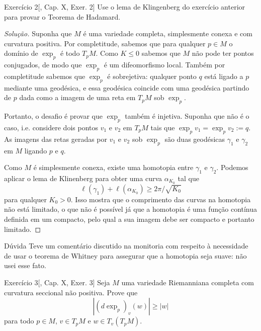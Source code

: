 \begin{thing6}{Exercício 2}[\cite{doc}, Cap. X, Exer. 2]\label{exer:2}\leavevmode
Use o lema de Klingenberg do exercício anterior para provar o Teorema de Hadamard.
\end{thing6}

\begin{proof}[Solução]\leavevmode
	Suponha que \(M\) é uma variedade completa, simplesmente conexa e com curvatura positiva. Por completitude, sabemos que para qualquer \(p \in M\) o domínio de \(\operatorname{exp}_p\) é todo \(T_pM\). Como \(K \leq 0\) sabemos que \(M\) não pode ter pontos conjugados, de modo que  \(\operatorname{exp}_p\) é um difeomorfismo local. Também por completitude sabemos que \(\operatorname{exp}_p\) é sobrejetiva: qualquer ponto \(q\) está ligado a \(p\) mediante uma geodésica, e essa geodésica coincide com uma geodésica partindo de \(p\) dada como a imagem de uma reta em \(T_pM\) sob \(\operatorname{exp}_p\).

	Portanto, o desafio é provar que \(\operatorname{exp}_p\) também é injetiva. Suponha que não é o caso, i.e. considere dois pontos \(v_1\) e \(v_2\) em \(T_pM\) tais que \(\operatorname{exp}_pv_1=\operatorname{exp}_pv_2:=q\). As imagens das retas geradas por \(v_1\) e \(v_2\) sob \(\operatorname{exp}_p\) são duas geodésicas \(\gamma_1\) e \(\gamma_2\) em \(M\) ligando \(p\) e \(q\).

	Como \(M\) é simplesmente conexa, existe uma homotopia entre \(\gamma_1\) e \(\gamma_2\). Podemos aplicar o lema de Klinenberg para obter uma curva \(\alpha_{K_0}\) tal que
	\[\ell(\gamma_1)+\ell(\alpha_{K_0}) \geq 2\pi/\sqrt{K_0}\]
para qualquer \(K_0>0\). Isso mostra que o comprimento das curvas na homotopia não está limitado, o que não é possível já que a homotopia é uma função contínua definida em um compacto, pelo qual a sua imagem debe ser compacto e portanto limitado.
\end{proof}

\begin{thing7}{Dúvida}\leavevmode
Teve um comentário discutido na monitoria com respeito à necessidade de usar o teorema de Whitney para assegurar que a homotopia seja suave: não usei esse fato.
\end{thing7}

\begin{thing6}{Exercício 3}[\cite{doc}, Cap. X, Exer. 3]\label{exer:3}\leavevmode
Seja \(M\) uma variedade Riemanniana completa com curvatura seccional não positiva. Prove que
\[|(d \operatorname{exp}_p)_v(w)|\geq |w|\]
para todo \(p \in M\), \(v \in T_pM\) e \(w \in T_v(T_pM)\).
\end{thing6}


